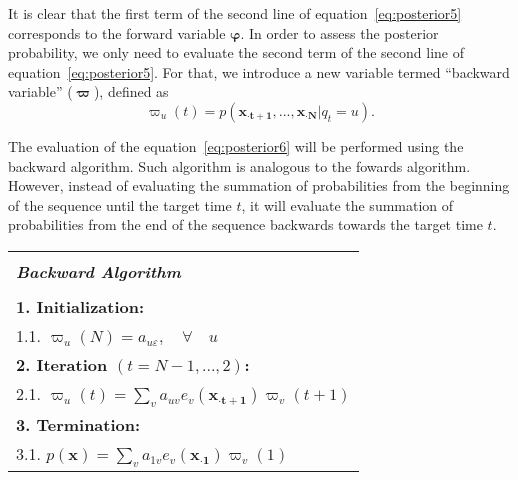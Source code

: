 It is clear that the first term of the second line of equation~\ref{eq:posterior5} corresponds to the forward variable $ \boldsymbol\varphi $. In order to assess the posterior probability, we only need to evaluate the second term of the second line of equation~\ref{eq:posterior5}. For that, we introduce a new variable termed ``backward variable'' ($ \boldsymbol\varpi $), defined as
\begin{equation}
  \label{eq:posterior6}
  \varpi_u(t) = p(\mathbf{{x}_{\cdot t+1}}, ..., \mathbf{{x}_{\cdot N}} | q_t = u).
\end{equation}

The evaluation of the equation~\ref{eq:posterior6} will be performed using the backward algorithm. Such algorithm is analogous to the fowards algorithm. However, instead of evaluating the summation of probabilities from the beginning of the sequence until the target time $ t $, it will evaluate the summation of probabilities from the end of the sequence backwards towards the target time $ t $.

\begin{center}
  \begin{spacing}{1.0}
    \begin{tabular}{l}
      \hline \\[-0.25cm]
      \hspace{1.3cm} {\large {\bf \emph{ Backward Algorithm } } } \hspace{1.3cm} \\[0.1cm]
      \hline \\[-0.25cm]
      \hspace{0.2cm} {\bf 1. Initialization:} \\
      \hspace{0.9cm} 1.1. $ \varpi_u(N) = a_{u\varepsilon}, \quad \forall \quad u $ \\
      \hspace{0.2cm} {\bf 2. Iteration $ (t = N-1, ..., 2) $:} \\
      \hspace{0.9cm} 2.1. $ \varpi_u(t) = \sum_{v}{a_{uv} e_v(\mathbf{{x}_{\cdot t+1}}) \varpi_v(t+1)} $ \\
      \hspace{0.2cm} {\bf 3. Termination:} \\
      \hspace{0.9cm} 3.1. $ p(\mathbf{x}) = \sum_{v}{a_{1v} e_v(\mathbf{{x}_{\cdot 1}}) \varpi_v(1)} $ \\[0.1cm]
      \hline
    \end{tabular}
  \end{spacing}
\end{center}

